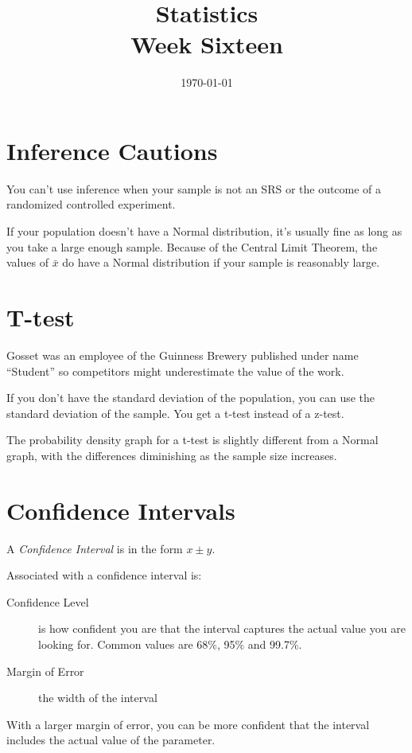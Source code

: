 \documentclass[landscape]{exam}
\title{Statistics \\ Week Sixteen}
\date{\today}
\author{}
\begin{document}
  \maketitle
  \tableofcontents

  \section{Inference Cautions}
  You can't use inference when your sample is not an SRS or the outcome of a
  randomized controlled experiment.

  If your population doesn't have a Normal distribution, it's usually fine as
  long as you take a large enough sample. Because of the Central Limit Theorem,
  the values of $\bar{x}$ do have a Normal distribution if your sample is
  reasonably large.

  \section{T-test}
  Gosset was an employee of the Guinness Brewery published under name
  ``Student'' so competitors might underestimate the value of the work.

  If you don't have the standard deviation of the population, you can use the
  standard deviation of the sample. You get a t-test instead of a z-test.

  The probability density graph for a t-test is slightly different from a Normal
  graph, with the differences diminishing as the sample size increases.

  \section{Confidence Intervals}
  A {\em Confidence Interval} is in the form $x \pm y$.

  Associated with a confidence interval is:
  \begin{description}
    \item[Confidence Level] is how confident you are that the interval
      captures the actual value you are looking for. Common values are 68\%,
      95\% and 99.7\%.

    \item[Margin of Error] the width of the interval
  \end{description}

  With a larger margin of error, you can be more confident that the interval
  includes the actual value of the parameter.
\end{document}
